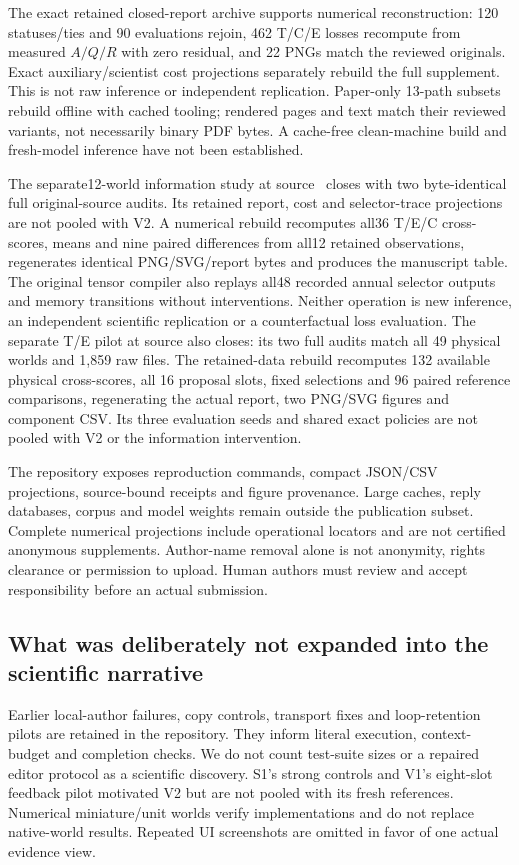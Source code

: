 The exact retained closed-report archive supports numerical reconstruction:
120 statuses/ties and 90 evaluations rejoin, 462 T/C/E losses recompute from
measured $A/Q/R$ with zero residual, and 22 PNGs match the reviewed originals.
Exact auxiliary/scientist cost projections separately rebuild the full
supplement. This is not raw inference or independent replication. Paper-only
13-path subsets rebuild offline with cached tooling; rendered pages and text
match their reviewed variants, not necessarily binary PDF bytes. A cache-free
clean-machine build and fresh-model inference have not been established.

The separate12-world information study at source~ closes with
two byte-identical full original-source audits. Its retained report, cost and
selector-trace projections are not pooled with V2. A numerical rebuild
recomputes all36 T/E/C cross-scores, means and nine paired differences from
all12 retained observations, regenerates identical PNG/SVG/report bytes and
produces the manuscript table. The original tensor compiler also replays all48
recorded annual selector outputs and memory transitions without interventions.
Neither operation is new inference, an independent scientific replication or
a counterfactual loss evaluation. The separate T/E pilot at source
 also closes: its two full audits match all 49 physical worlds
and 1,859 raw files. The retained-data rebuild recomputes 132 available
physical cross-scores, all 16 proposal slots, fixed selections and 96 paired
reference comparisons, regenerating the actual report, two PNG/SVG figures
and component CSV. Its three evaluation seeds and shared exact policies are
not pooled with V2 or the information intervention.

The repository exposes reproduction commands, compact JSON/CSV projections,
source-bound receipts and figure provenance. Large caches, reply databases,
corpus and model weights remain outside the publication subset. Complete
numerical projections include operational locators and are not certified
anonymous supplements. Author-name removal alone is not anonymity, rights
clearance or permission to upload. Human authors must review and accept
responsibility before an actual submission.

\subsection{What was deliberately not expanded into the scientific narrative}
Earlier local-author failures, copy controls, transport fixes and loop-retention
pilots are retained in the repository. They inform literal execution,
context-budget and completion checks. We do not count test-suite sizes or a
repaired editor protocol as a scientific discovery. S1's strong controls and
V1's eight-slot feedback pilot motivated V2 but are not pooled with its fresh
references. Numerical miniature/unit worlds verify implementations and do not
replace native-world results. Repeated UI screenshots are omitted in favor of
one actual evidence view.


